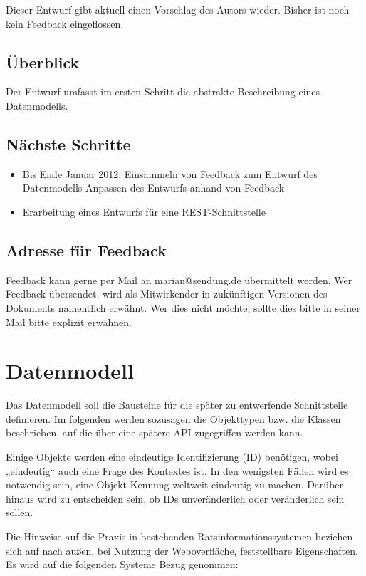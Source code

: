 Dieser Entwurf gibt aktuell einen Vorschlag des Autors wieder. Bisher
ist noch kein Feedback eingeflossen.

\subsection{Überblick}

Der Entwurf umfasst im ersten Schritt die abstrakte Beschreibung eines
Datenmodells.

\subsection{Nächste Schritte}

\begin{itemize}
\item
  Bis Ende Januar 2012: Einsammeln von Feedback zum Entwurf des
  Datenmodells Anpassen des Entwurfs anhand von Feedback
\item
  Erarbeitung eines Entwurfs für eine REST-Schnittstelle
\end{itemize}

\subsection{Adresse für Feedback}

Feedback kann gerne per Mail an marian@sendung.de übermittelt werden.
Wer Feedback übersendet, wird als Mitwirkender in zukünftigen Versionen
des Dokuments namentlich erwähnt. Wer dies nicht möchte, sollte dies
bitte in seiner Mail bitte explizit erwähnen.

\section{Datenmodell}

Das Datenmodell soll die Bausteine für die später zu entwerfende
Schnittstelle definieren. Im folgenden werden sozusagen die Objekttypen
bzw. die Klassen beschrieben, auf die über eine spätere API zugegriffen
werden kann.

Einige Objekte werden eine eindeutige Identifizierung (ID) benötigen,
wobei „eindeutig`` auch eine Frage des Kontextes ist. In den wenigsten
Fällen wird es notwendig sein, eine Objekt-Kennung weltweit eindeutig zu
machen. Darüber hinaus wird zu entscheiden sein, ob IDs unveränderlich
oder veränderlich sein sollen.

Die Hinweise auf die Praxis in bestehenden Ratsinformationssystemen
beziehen sich auf nach außen, bei Nutzung der Weboverfläche,
feststellbare Eigenschaften. Es wird auf die folgenden Systeme Bezug
genommen:

